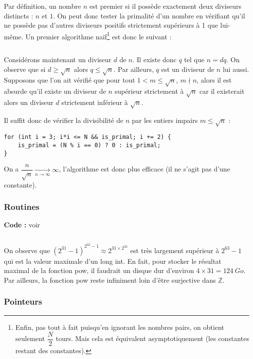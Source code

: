 \documentclass[../main.tex]{subfiles}
\begin{document}
\newline
Par définition, un nombre $n$ est premier si il possède exactement deux diviseurs distincts : $n$ et $1$. On peut donc tester la primalité d'un nombre en vérifiant qu'il ne possède pas d'autres diviseurs positifs strictement supérieurs à 1 que lui-même. Un premier algorithme naïf\footnote{Enfin, pas tout à fait puisqu'en ignorant les nombres pairs, on obtient seulement $\dfrac{N}{2}$ tours. Mais cela est équivalent asymptotiquement (les constantes restant des constantes).} est donc le suivant :
\inputminted{c}{solutions/part2/chapter2/primal_test.c}
Considérons maintenant un diviseur $d$ de $n$. Il existe donc $q$ tel que $n = dq$. On observe que si $d \geq \sqrt{n}$ alors $q \leq{\sqrt{n}}$. Par ailleurs, $q$ est un diviseur de $n$ lui aussi. Supposons que l'on ait vérifié que pour tout $1 < m \leq \sqrt{n}$, $m\nmid{n}$, alors il est absurde qu'il existe un diviseur de $n$ supérieur strictement à $\sqrt{n}$ car il existerait alors un diviseur $d$ strictement inférieur à $\sqrt{n}$.
 
Il suffit donc de vérifier la divisibilité de $n$ par les entiers impairs $m\leq{\sqrt{n}}$ :
\begin{verbatim}
for (int i = 3; i*i <= N && is_primal; i += 2) {
	is_primal = (N % i == 0) ? 0 : is_primal;
}
\end{verbatim}
On a $\dfrac{n}{\sqrt{n}}\underset{n\rightarrow{\infty}}{\rightarrow}\infty$, l'algorithme est donc plus efficace (il ne s'agit pas d'une constante).
\subsubsection{Routines}

\textbf{Code :} voir 

\inputminted{c}{solutions/part2/chapter2/int_pow.c}
On observe que $(2^{31}-1)^{2^{32}-1}\approx{2^{31\times{2^{32}}}}$ est très largement supérieur à $2^{63} - 1$ qui est la valeur maximale d'un \textsf{long int}. En fait, pour stocker le résultat maximal de la fonction \textsf{pow}, il faudrait un disque dur d'environ $4\times{31} = 124\ Go$. Par ailleurs, la fonction \textsf{pow} reste infiniment loin d'être surjective dans $\mathbb{Z}$.
\subsubsection{Pointeurs}
\end{document}
